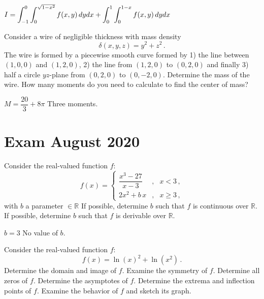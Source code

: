 \begin{Answer}
    $\displaystyle I = \int_{-1}^0\int_0^{\sqrt{1-x^2}} f(x,y)\, dydx + \int_{0}^1\int_0^{1-x} f(x,y)\, dydx$
\end{Answer}




\begin{Exercise} Consider a wire of negligible thickness with mass density 
$$\delta(x,y,z)=y^2+z^2\,.$$
The wire is formed by a piecewise smooth curve formed by 1) the line between $(1,0,0)$ and $(1,2,0)$, 2) the line from $(1,2,0)$ to $(0,2,0)$ and finally 3) half a circle $yz$-plane from $(0,2,0)$ to $(0,-2,0)$. 
\Question Determine the mass of the wire. 
\Question How many moments do you need to calculate to find the center of mass?  
\end{Exercise}

\begin{Answer}
 
\Question $M = \dfrac{20}{3} + 8\pi$
\Question Three moments.
   
\end{Answer}






\section{Exam August 2020}
\begin{Exercise} Consider the real-valued function $f$:
$$
f(x)=\left\{\begin{array}{rcl}
\dfrac{x^3-27}{x-3}&,&x<3\,,\\[0.4cm]
2x^2+b\,x&,&x\geq3\,,
\end{array}\right.
$$
with $b$ a parameter $\in \mathbb{R}$
\Question If possible, determine $b$ such that $f$ is continuous over $\mathbb{R}$. 
\Question If possible, determine $b$ such that $f$ is derivable over $\mathbb{R}$. 
\end{Exercise}

\begin{Answer}

\Question $b=3$
\Question No value of $b$.
  
\end{Answer}



\begin{Exercise}[label=synthese_0] Consider the real-valued function $f$:
$$
f(x)=\ln(x)^2+\ln(x^2)\,.
$$
\Question Determine the domain and image of $f$.
    \Question Examine the symmetry of $f$.
    \Question Determine all zeros of $f$.
    \Question Determine the asymptotes of $f$.
    \Question Determine the extrema and inflection points of $f$.
    \Question Examine the behavior of $f$ and sketch its graph.
\end{Exercise}

